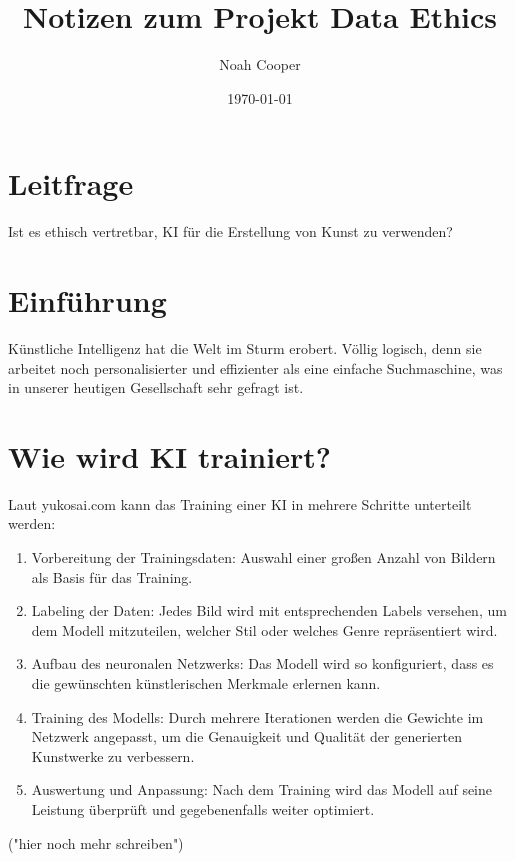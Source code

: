 \documentclass{article}
\title{Notizen zum Projekt Data Ethics}
\author{Noah Cooper}
\date{\today}
\begin{document}
\maketitle


\tableofcontents

\newpage

\section{Leitfrage}
    Ist es ethisch vertretbar, KI für die Erstellung von Kunst zu verwenden?

\section{Einführung}
    Künstliche Intelligenz hat die Welt im Sturm erobert. Völlig logisch, denn sie arbeitet noch 
    personalisierter und effizienter als eine einfache Suchmaschine, was in unserer heutigen Gesellschaft 
    sehr gefragt ist. 


\section{Wie wird KI trainiert?}
    Laut yukosai.com kann das Training einer KI in mehrere Schritte unterteilt werden:
    \begin{enumerate}
        \item Vorbereitung der Trainingsdaten: Auswahl einer großen Anzahl von Bildern als Basis für das Training.
        \item Labeling der Daten: Jedes Bild wird mit entsprechenden Labels versehen, um dem Modell mitzuteilen, welcher Stil oder welches Genre repräsentiert wird.
        \item Aufbau des neuronalen Netzwerks: Das Modell wird so konfiguriert, dass es die gewünschten künstlerischen Merkmale erlernen kann.
        \item Training des Modells: Durch mehrere Iterationen werden die Gewichte im Netzwerk angepasst, um die Genauigkeit und Qualität der generierten Kunstwerke zu verbessern.
        \item Auswertung und Anpassung: Nach dem Training wird das Modell auf seine Leistung überprüft und gegebenenfalls weiter optimiert.
    \end{enumerate}
    ("hier noch mehr schreiben")
\end{document}
